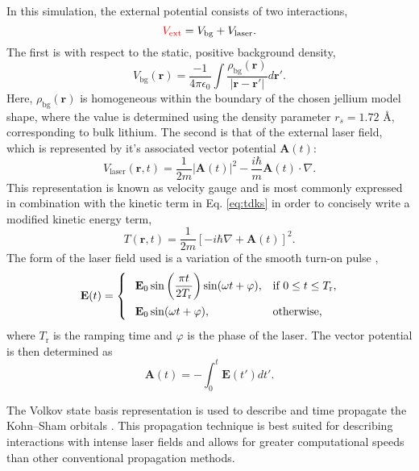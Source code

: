 \documentclass[%
 reprint,
 amsmath,amssymb,
pra,
tightenlines
]{revtex4-1}
\newcommand{\rvec}{\mathbf{r}} %
\newcommand{\rev}[1]{{\color{red} #1}}
\begin{document}
In this simulation, the external potential consists of two interactions, 
\begin{equation}
\rev{V_\text{ext}} = V_\text{bg} + V_\text{laser}.
\label{eq:ext}
\end{equation}
The first is with respect to the static, positive background density,  
\begin{equation}
V_\text{bg}(\rvec) = \frac{-1}{4\pi\epsilon_0}\int \frac{\rho_\text{bg}(\rvec)}{|\rvec-\rvec'|}d\rvec'. 
\label{eq:bg}
\end{equation}
Here, $\rho_\text{bg}(\rvec)$ is homogeneous within the boundary of the chosen jellium model shape, where the value is determined using the density parameter $r_s=1.72$ {\AA}, corresponding to bulk lithium. 
The second is that of the external laser field, which is represented by it's associated vector potential $\mathbf{A}(t)$:
\begin{equation}
V_\text{laser}(\rvec,t) = \frac{1}{2m}|\mathbf{A}(t)|^2 - \frac{i\hbar}{m}\mathbf{A}(t)\cdot\nabla.
\label{eq:bg}
\end{equation}
This representation is known as velocity gauge and is most commonly expressed in combination with the kinetic term in Eq. \eqref{eq:tdks} in order to concisely write a modified kinetic energy term,
\begin{equation}
T(\rvec,t) = \frac{1}{2m}\left[-i\hbar\nabla + \mathbf{A}(t)\right]^2.
\end{equation}
The form of the laser field used is a variation of the smooth turn-on pulse \cite{compnano_varga},
\begin{equation}
\label{eq:laser}
\mathbf{E}(t)=
\begin{cases}
\hphantom{-}\mathbf{E}_0\sin\left(\dfrac{\pi t}{2T_\text{r}}\right)\sin(\omega t+\varphi), &\text{if $0 \leq t \leq T_\text{r}$},\\[2ex]
\hphantom{-}{\mathbf{E}_0}\sin(\omega t+\varphi), &\text{otherwise},
\end{cases}
\end{equation}
\rev{where $T_\text{r}$ is the ramping time and $\varphi$ is the phase of the laser}. 
The vector potential is then determined as
\begin{equation}
\mathbf{A}(t) = -\int_0^t \mathbf{E}(t')dt'.
\end{equation}

The Volkov state basis representation is used to describe and time propagate the Kohn--Sham orbitals \cite{PhysRevA.95.013414}. This propagation technique is best suited for describing interactions with intense laser fields and allows for greater computational speeds than other conventional propagation methods. 
\end{document}

